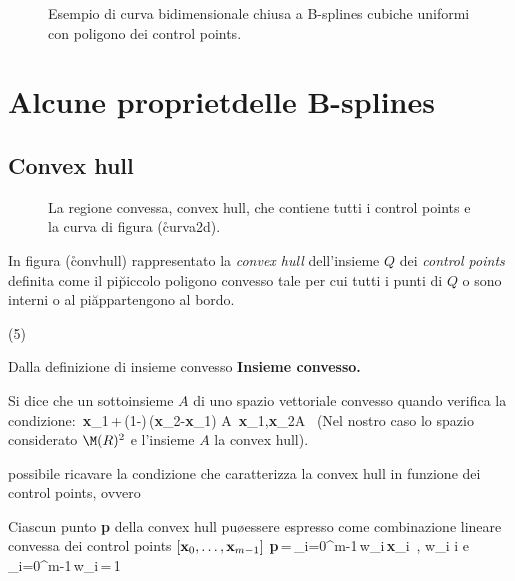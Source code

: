 \begin{figure}[tbp]
 \centerline{
  }
 \caption[Curva 2D a B-splines ]
  {Esempio di curva bidimensionale chiusa a B-splines cubiche uniformi con poligono dei
   control points.}
\end{figure}

\section{Alcune propriet\a delle B-splines}

\subsection{Convex hull}

\begin{figure}[tbp]
 \centerline{
  }
 \caption[Convex Hull]
  {La regione convessa, convex hull, che contiene tutti i control points e la curva di 
   figura (\r{curva2d}).}
\end{figure}

In figura (\r{convhull}) \e rappresentato la {\it convex hull} dell'insieme $Q$ dei
{\it control points} definita come il pi\u piccolo poligono convesso tale per cui tutti 
i punti di $Q$ o sono interni o al pi\u appartengono al bordo.

\vs(5)

Dalla definizione di insieme convesso
\bdf
{\bf Insieme convesso.}\par
Si dice che un sottoinsieme $A$ di uno spazio vettoriale \e convesso quando verifica la
condizione:
\be
\alpha\,{\bf x}_1\,+\,(1-\alpha)\,({\bf x}_2-{\bf x}_1)\,\in\,A \qquad 
 \forall\,{\bf x}_1,{\bf x}_2\in A \quad \forall\,\alpha\in [0,1]
\ee
\edf
(Nel nostro caso lo spazio considerato \e $\M(R)^2$ e l'insieme $A$ \e la convex hull).

\e possibile ricavare la condizione che caratterizza la convex hull in funzione dei
control points, ovvero
\bpr
\par
Ciascun punto {\bf p} della convex hull pu\o essere espresso come combinazione lineare
convessa dei control points $[{\bf x}_0,\dots,{\bf x}_{m-1}]$
\be
{\bf p}\,=\,\sum_{i=0}^{m-1}\,w_i\,{\bf x}_i\, ,\qquad
w_i \quad\forall i \quad e \quad \sum_{i=0}^{m-1}\,w_i\,=\,1
\ee
\epr   

